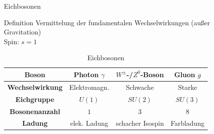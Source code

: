 \documentclass[aspectratio=169,xcolor=dvipsnames]{beamer}
\begin{document}
\begin{frame}{Eichbosonen}
    \begin{alertblock}{Definition}
        \centering Vermittelung der fundamentalen Wechselwirkungen (außer Gravitation) \\
        Spin: $s=1$
    \end{alertblock}
    \vspace{10pt}
    \begin{table}
        \centering
        \begin{tabular}{c|c|c|c}
            \bf Boson          & Photon $\gamma$ & $W^\pm$-/$Z^0$-Boson & Gluon $g$  \\ \hline
            \bf Wechselwirkung & Elektromagn.    & Schwache             & Starke     \\ \hline
            \bf Eichgruppe     & $U(1)$          & $SU(2)$              & $SU(3)$    \\ \hline
            \bf Bosonenanzahl  & $1$             & $3$                  & $8$        \\ \hline
            \bf Ladung         & elek. Ladung    & schacher Isospin     & Farbladung
        \end{tabular}
        \caption{Eichbosonen}
        \label{tab:eichbosonen}
    \end{table}
\end{frame}
\end{document}
